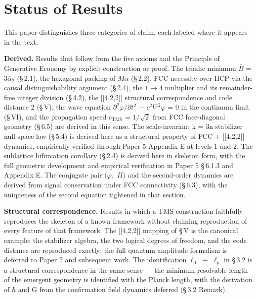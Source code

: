 \documentclass[11pt,oneside]{report}
\theoremstyle{definition}
\theoremstyle{remark}
\begin{document}
\section*{Status of Results}

This paper distinguishes three categories of claim, each labeled where
it appears in the text.

\textbf{Derived.} Results that follow from the five axioms and the
Principle of Generative Economy by explicit construction or proof. The
triadic minimum \ensuremath{\bar{B}} = \ensuremath{3\bar{\alpha}_{2}} (\S\,2.1), the hexagonal packing of \ensuremath{M\alpha} (\S\,2.2), FCC
necessity over HCP via the causal distinguishability argument (\S\,2.4),
the \ensuremath{1\to 4} multiplier and its remainder-free integer division (\S\,4.2), the
[[4,2,2]] structural correspondence and code distance 2 (\S\,V),
the wave equation \ensuremath{\partial ^{2}\varphi /\partial t^{2}} \ensuremath{-} \ensuremath{c^{2}\nabla ^{2}\varphi} = 0 in the continuum limit (\S\,VI), and
the propagation speed \ensuremath{c_{\mathrm{TMS}}} = \ensuremath{1/\sqrt{2}} from FCC face-diagonal geometry (\S\,6.5)
are derived in this sense. The scale-invariant k = 3n stabilizer
null-space law (\S\,5.4) is derived here as a structural property of FCC +
[[4,2,2]] dynamics, empirically verified through Paper 5
Appendix E at levels 1 and 2. The sublattice bifurcation corollary
(\S\,2.4) is derived here in skeleton form, with the full geometric
development and empirical verification in Paper 5 \S\,6.1.3 and Appendix E.
The conjugate pair \ensuremath{(\varphi ,} \ensuremath{\Pi )} and the second-order dynamics are derived from
signal conservation under FCC connectivity (\S\,6.3), with the uniqueness
of the second equation tightened in that section.

\textbf{Structural correspondence.} Results in which a TMS construction
faithfully reproduces the skeleton of a known framework without claiming
reproduction of every feature of that framework. The [[4,2,2]]
mapping of \S\,V is the canonical example: the stabilizer algebra, the two
logical degrees of freedom, and the code distance are reproduced
exactly; the full quantum amplitude formalism is deferred to Paper 2 and
subsequent work. The identification \ensuremath{\ell_{0}} \ensuremath{\equiv} \ensuremath{\ell_{p}} in \S\,3.2 is a structural
correspondence in the same sense --- the minimum resolvable length of
the emergent geometry is identified with the Planck length, with the
derivation of \ensuremath{\hbar} and G from the confirmation field dynamics deferred
(\S\,3.2 Remark).
\end{document}
